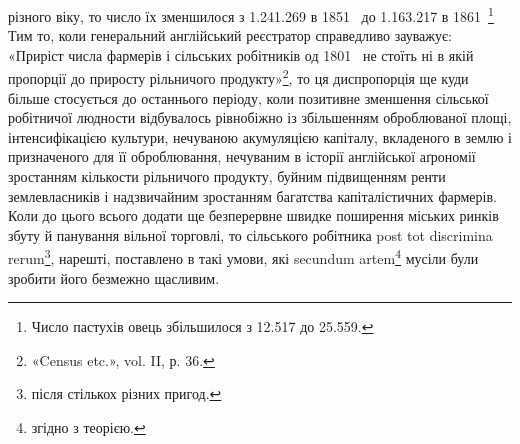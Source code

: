 \parcont{}  %
різного віку, то число їх зменшилося з \num{1.241.269} в 1851~ до
\num{1.163.217} в 1861~\footnote{
Число пастухів овець збільшилося з \num{12.517} до \num{25.559}.
} Тим то, коли генеральний англійський
реєстратор справедливо зауважує: «Приріст числа фармерів і
сільських робітників од 1801~ не стоїть ні в якій пропорції
до приросту рільничого продукту»\footnote{
«Census etc.», vol. II, р. 36.
}, то ця диспропорція ще
куди більше стосується до останнього періоду, коли позитивне
зменшення сільської робітничої людности відбувалось рівнобіжно
із збільшенням оброблюваної площі, інтенсифікацією культури,
нечуваною акумуляцією капіталу, вкладеного в землю і призначеного
для її оброблювання, нечуваним в історії англійської
аґрономії зростанням кількости рільничого продукту, буйним
підвищенням ренти землевласників і надзвичайним зростанням
багатства капіталістичних фармерів. Коли до цього всього додати
ще безперервне швидке поширення міських ринків збуту й
панування вільної торговлі, то сільського робітника post tot
discrimina rerum\footnote*{
після стількох різних пригод. 
}, нарешті, поставлено в такі умови, які secundum
artem\footnote*{
згідно з теорією. 
} мусіли були зробити його безмежно щасливим.

